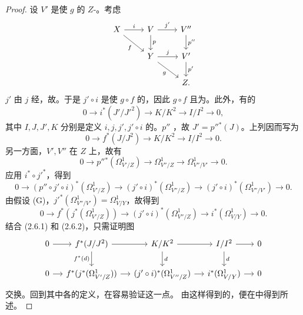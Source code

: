 \begin{proof}
设 $V'$ 是使 $g$ 的 $Z$-。考虑
\[
\begin{tikzcd}X\arrow[r,"i"]\arrow[dr,"f"']&V\arrow[r,"j'"]\arrow[d,"p"]&V''\arrow[d,"p''"]\\&Y\arrow[r,"j"]\arrow[dr,"g"']&V'\arrow[d,"p'"]\\&&Z.\end{tikzcd}
\]
 $j'$ 由 $j$ 经，故。于是 $j'\circ i$ 是使 $g\circ f$ 的，因此 $g\circ f$ 且为。此外，有的
\[0\longrightarrow i^*(J'/J'^2)\longrightarrow K/K^2\longrightarrow I/I^2\longrightarrow0,\]
其中 $I,J,J',K$ 分别是定义 $i,j,j',j'\circ i$ 的。$p''$ ，故 $J'=p''{}^*(J)$。上列因而写为
\[0\longrightarrow f^*(J/J^2)\longrightarrow K/K^2\longrightarrow I/I^2\longrightarrow0.\tag{2.6.1}\]
另一方面，$V',V''$ 在 $Z$ 上，故有
\[0\longrightarrow p''{}^*(\Omega^1_{V'/Z})\longrightarrow\Omega^1_{V''/Z}\longrightarrow\Omega^1_{V''/V'}\longrightarrow0.\]
应用 $i^*\circ j'^*$，得到
\[0\longrightarrow(p''\circ j'\circ i)^*(\Omega^1_{V'/Z})\longrightarrow(j'\circ i)^*(\Omega^1_{V''/Z})\longrightarrow(j'\circ i)^*(\Omega^1_{V''/V'})\longrightarrow0.\]
由假设 (G)，$j'^*(\Omega^1_{V''/V'})=\Omega^1_{V/Y}$，故得到
\[0\longrightarrow f^*(j^*(\Omega^1_{V'/Z}))\longrightarrow(j'\circ i)^*(\Omega^1_{V''/Z})\longrightarrow i^*(\Omega^1_{V/Y})\longrightarrow0.\tag{2.6.2}\]
结合 (2.6.1) 和 (2.6.2)，只需证明图
\[
\begin{tikzcd}[column sep=small]
0\arrow[r]&f^*(J/J^2)\arrow[r]\arrow[d,"f^*(d)"']&K/K^2\arrow[r]\arrow[d,"d"]&I/I^2\arrow[r]\arrow[d,"d"]&0\\
0\arrow[r]&f^*(j^*(\Omega^1_{V'/Z}))\arrow[r]&(j'\circ i)^*(\Omega^1_{V''/Z})\arrow[r]&i^*(\Omega^1_{V/Y})\arrow[r]&0
\end{tikzcd}
\]
交换。回到其中各的定义，在容易验证这一点。
由这样得到的，便在中得到所述。
\end{proof}
